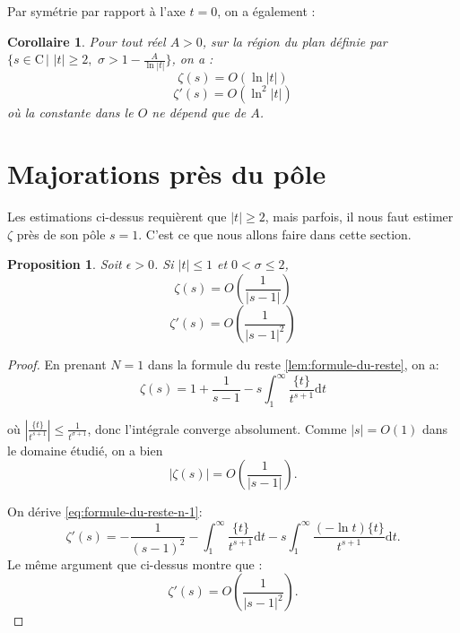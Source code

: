 \documentclass[french]{report}
\newtheorem{proposition}[theorem]{Proposition}
\newtheorem{corollary}[theorem]{Corollaire}
\begin{document}
Par symétrie par rapport à l'axe $t=0$, on a également :

\begin{corollary}\label{cor:majoration-zeta-et-zeta-prime}
  Pour tout réel $A>0$, sur la région du plan définie par $\{s\in\mathrm{C}\,|\,\,|t|\geq2,\,\,\sigma>1-\frac{A}{\ln |t|}\}$, on a :
  \[ \zeta(s) = O(\ln |t|) \]
  \[ \zeta'(s) = O(\ln^2 |t|) \]
  où la constante dans le $O$ ne dépend que de $A$.
\end{corollary}

\section{Majorations près du pôle}

Les estimations ci-dessus requièrent que $|t|\geq2$, mais parfois, il nous faut estimer $\zeta$ près de son pôle $s=1$. C'est ce que nous allons faire dans cette section.

\begin{proposition}\label{prop:majorations-pres-du-pole}
  Soit $\epsilon>0$. Si $|t|\leq1$ et $0<\sigma\leq2$,
  \[ \zeta(s) = O\left(\frac{1}{|s-1|}\right) \]
  \[ \zeta'(s) = O\left(\frac{1}{|s-1|^2}\right) \]
\end{proposition}

\begin{proof}
  En prenant $N=1$ dans la formule du reste \ref{lem:formule-du-reste}, on a:
  \begin{equation}\label{eq:formule-du-reste-n-1}
    \zeta(s) = 1+\frac{1}{s-1}-s\int_1^\infty\frac{\{t\}}{t^{s+1}}\mathrm{d}t
  \end{equation}

  où $\left|\frac{\{t\}}{t^{s+1}}\right|\leq\frac{1}{t^{\sigma+1}}$, donc l'intégrale converge absolument. Comme $|s|=O(1)$ dans le domaine étudié, on a bien
  \[ |\zeta(s)| = O\left(\frac{1}{|s-1|}\right). \]

  On dérive \ref{eq:formule-du-reste-n-1}:
  \[
    \zeta'(s)
    = -\frac{1}{(s-1)^2}
    - \int_1^\infty\frac{\{t\}}{t^{s+1}}\mathrm{d}t
    - s\int_1^\infty\frac{(-\ln t)\{t\}}{t^{s+1}}\mathrm{d}t.
  \]
  Le même argument que ci-dessus montre que :
  \[ \zeta'(s) = O\left(\frac{1}{|s-1|^2}\right). \]
\end{proof}
\end{document}
